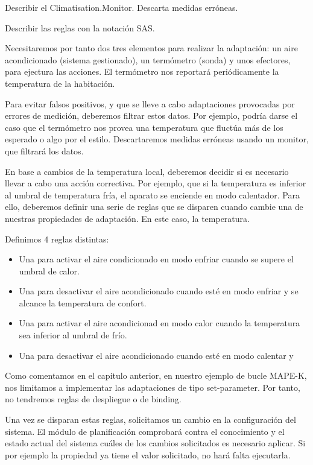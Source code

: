 Describir el Climatisation.Monitor. Descarta medidas erróneas.

Describir las reglas con la notación SAS.

Necesitaremos por tanto dos tres elementos para realizar la adaptación: un aire acondicionado (sistema gestionado), un termómetro (sonda) y unos efectores, para ejectura las acciones. El termómetro nos reportará periódicamente la temperatura de la habitación.

Para evitar falsos positivos, y que se lleve a cabo adaptaciones provocadas por errores de medición, deberemos filtrar estos datos. Por ejemplo, podría darse el caso que el termómetro nos provea una temperatura que fluctúa más de los esperado o algo por el estilo. Descartaremos medidas erróneas usando un monitor, que filtrará los datos.

En base a cambios de la temperatura local, deberemos decidir si es necesario llevar a cabo una acción correctiva. Por ejemplo, que si la temperatura es inferior al umbral de temperatura fría, el aparato se enciende en modo calentador. Para ello, deberemos definir una serie de reglas que se disparen cuando cambie una de nuestras propiedades de adaptación. En este caso, la temperatura.

Definimos 4 reglas distintas:
\begin{itemize}
  \item Una para activar el aire condicionado en modo enfriar cuando se supere el umbral de calor.
  \item Una para desactivar el aire acondicionado cuando esté en modo enfriar y se alcance la temperatura de confort.
  \item Una para activar el aire acondicionad en modo calor cuando la temperatura sea inferior al umbral de frío.
  \item Una para desactivar el aire acondicionado cuando esté en modo calentar y
\end{itemize}

Como comentamos en el capitulo anterior, en nuestro ejemplo de bucle MAPE-K, nos limitamos a implementar las adaptaciones de tipo set-parameter. Por tanto, no tendremos reglas de despliegue o de binding.

Una vez se disparan estas reglas, solicitamos un cambio en la configuración del sistema. El módulo de planificación comprobará contra el conocimiento y el estado actual del sistema cuáles de los cambios solicitados es necesario aplicar. Si por ejemplo la propiedad ya tiene el valor solicitado, no hará falta ejecutarla.

